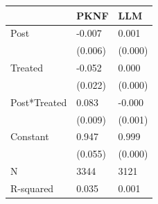\begin{tabular}{lll}
\toprule
 & PKNF & LLM \\
\midrule
Post & -0.007 & 0.001 \\
 & (0.006) & (0.000) \\
Treated & -0.052 & 0.000 \\
 & (0.022) & (0.000) \\
Post*Treated & 0.083 & -0.000 \\
 & (0.009) & (0.001) \\
Constant & 0.947 & 0.999 \\
 & (0.055) & (0.000) \\
N & 3344 & 3121 \\
R-squared & 0.035 & 0.001 \\
\bottomrule
\end{tabular}
